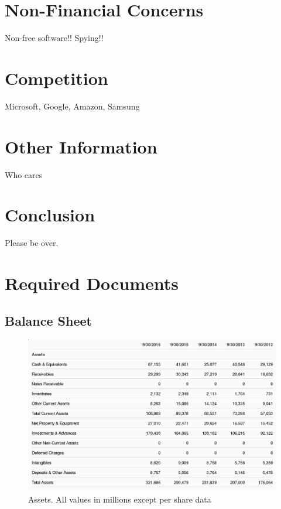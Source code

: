 \documentclass[12pt,a4paper,titlepage]{article}
\begin{document}

\section{Non-Financial Concerns}
Non-free software!! Spying!!

\section{Competition}
Microsoft, Google, Amazon, Samsung

\section{Other Information}
Who cares

\section{Conclusion}
Please be over.

\newpage

\section{Required Documents}
\subsection{Balance Sheet}
\begin{figure}[!htb]
  \centering
  \includegraphics[width=1\textwidth]{assets}
    \caption{Assets. All values in millions except per share data~\cite{zacks-bal}}
\end{figure}
\end{document}
